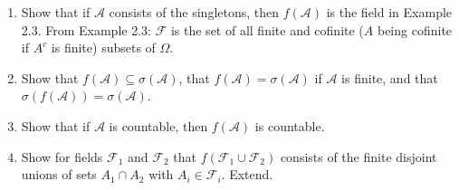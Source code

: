 \documentclass[11pt]{article}
\newcommand{\F}{\mathcal{F}}
\newcommand{\A}{\mathcal{A}}
\newcommand{\seq}{\subseteq}
\newcommand{\Om}{\Omega}
\newcommand{\un}{\cup}
\newcommand{\ic}{\cap}
\newenvironment{exercise}[2][Exercise]{\begin{trivlist}
\item[\hskip \labelsep {\bfseries #1}\hskip \labelsep {\bfseries #2.}]}{\end{trivlist}}
\begin{document}
\begin{exercise}{2.6}
    \begin{enumerate}
        \item Show that if $\A$ consists of the singletons, then $f(\A)$ is the field in Example 2.3. From Example 2.3: $\F$ is the set of all finite and cofinite ($A$ being cofinite if $A^c$ is finite) subsets of $\Om$.
        \item Show that $f(\A) \seq \sigma (\A)$, that $f(\A) = \sigma (\A)$ if $\A$ is finite, and that $\sigma (f(\A)) = \sigma (\A)$.
        \item Show that if $\A$ is countable, then $f(\A)$ is countable.
        \item Show for fields $\F_1$ and $\F_2$ that $f(\F_1 \un \F_2)$ consists of the finite disjoint unions of sets $A_1 \ic A_2$ with $A_i \in \F_i$. Extend.
    \end{enumerate}
\end{exercise}
\end{document}
